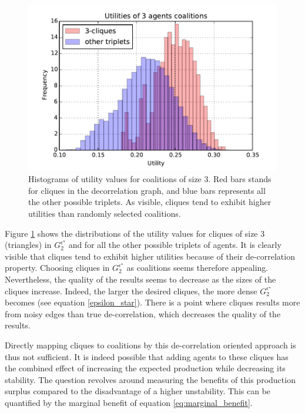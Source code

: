 \documentclass[conference]{IEEEtran}
\begin{document}
\begin{figure}
\includegraphics[scale=.6]{cliques_histo.pdf}
\caption{Histograms of utility values for coalitions of size 3. Red bars stands for cliques in the decorrelation graph, and blue bars represents all the other possible triplets. As visible, cliques tend to exhibit higher utilities than randomly selected coalitions.}
\label{fig:histo_cliques}
\end{figure}

Figure \ref{fig:histo_cliques} shows the distributions of the utility values for cliques of size 3 (triangles) in $ G_{2}^{\epsilon^{\star}} $ and for all the other possible triplets of agents. It is clearly visible that cliques tend to exhibit higher utilities because of their de-correlation property. Choosing cliques in $ G_{2}^{\epsilon^{\star}} $ as coalitions seems therefore appealing. Nevertheless, the quality of the results seems to decrease as the sizes of the cliques increase. Indeed, the larger the desired cliques, the more dense $ G_{2}^{\epsilon^{\star}} $ becomes (see equation \ref{epsilon_star}). There is a point where cliques results more from noisy edges than true de-correlation, which decreases the quality of the results.

Directly mapping cliques to coalitions by this de-correlation oriented approach is thus not sufficient. It is indeed possible that adding agents to these cliques has the combined effect of increasing the expected production while decreasing its stability. The question revolves around measuring the benefits of this production surplus compared to the disadvantage of a higher unstability. This can be quantified by the marginal benefit of equation \ref{eq:marginal_benefit}.
\end{document}
